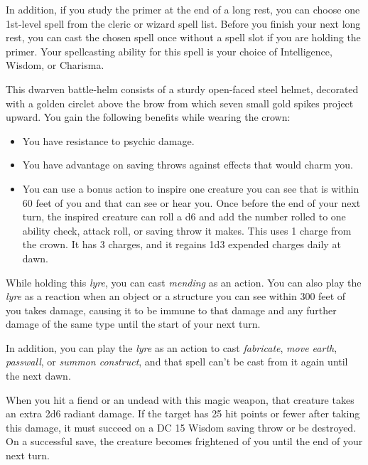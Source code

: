 \documentclass[10pt,a4paper,twoside,bg=print,twocolumn,openany,nodeprecatedcode]{dndbook}
\begin{document}
In addition, if you study the primer at the end of a long rest, you can choose one 1st-level spell from the cleric or wizard spell list. Before you finish your next long rest, you can cast the chosen spell once without a spell slot if you are holding the primer. Your spellcasting ability for this spell is your choice of Intelligence, Wisdom, or Charisma.

This dwarven battle-helm consists of a sturdy open-faced steel helmet, decorated with a golden circlet above the brow from which seven small gold spikes project upward. You gain the following benefits while wearing the crown:


\begin{itemize}
\item You have resistance to psychic damage.
\item You have advantage on saving throws against effects that would charm you.
\item You can use a bonus action to inspire one creature you can see that is within 60 feet of you and that can see or hear you. Once before the end of your next turn, the inspired creature can roll a d6 and add the number rolled to one ability check, attack roll, or saving throw it makes. This uses 1 charge from the crown. It has 3 charges, and it regains 1d3 expended charges daily at dawn.
\end{itemize}

While holding this \textit{lyre}, you can cast \textit{mending} as an action. You can also play the \textit{lyre} as a reaction when an object or a structure you can see within 300 feet of you takes damage, causing it to be immune to that damage and any further damage of the same type until the start of your next turn.

In addition, you can play the \textit{lyre} as an action to cast \textit{fabricate}, \textit{move earth}, \textit{passwall}, or \textit{summon construct}, and that spell can't be cast from it again until the next dawn.

When you hit a fiend or an undead with this magic weapon, that creature takes an extra 2d6 radiant damage. If the target has 25 hit points or fewer after taking this damage, it must succeed on a DC 15 Wisdom saving throw or be destroyed. On a successful save, the creature becomes frightened of you until the end of your next turn.
\end{document}
